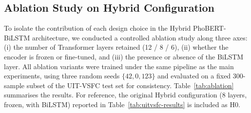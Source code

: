 \documentclass[12pt]{report} %
\begin{document}
\subsection{Ablation Study on Hybrid Configuration}
\label{subsec:ablation}

To isolate the contribution of each design choice in the Hybrid PhoBERT-BiLSTM architecture, we conducted a controlled ablation study along three axes: (i) the number of Transformer layers retained (12 / 8 / 6), (ii) whether the encoder is frozen or fine-tuned, and (iii) the presence or absence of the BiLSTM layer. All ablation variants were trained under the same pipeline as the main experiments, using three random seeds $\{42, 0, 123\}$ and evaluated on a fixed 300-sample subset of the UIT-VSFC test set for consistency. Table~\ref{tab:ablation} summarises the results. For reference, the original Hybrid configuration (8 layers, frozen, with BiLSTM) reported in Table~\ref{tab:uitvsfc-results} is included as H0.
\end{document}

